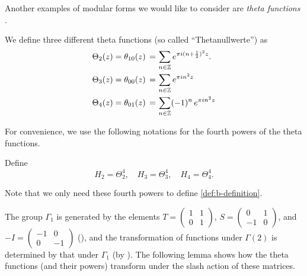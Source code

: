 Another examples of modular forms we would like to consider are \emph{theta functions} \cite[Section~3.1]{1-2-3}.
\begin{definition}\label{def:th00-th01-th10}\leanok
We define three different theta functions (so called ``Thetanullwerte'') as
\begin{align}
  \Theta_{2}(z) = \theta_{10}(z)\,=\, & \sum_{n\in\mathbb{Z}}e^{\pi i (n+\frac12)^2 z}.  \\
  \Theta_{3}(z) = \theta_{00}(z)\,=\, & \sum_{n\in\mathbb{Z}}e^{\pi i n^2 z}  \\
  \Theta_{4}(z) = \theta_{01}(z)\,=\, & \sum_{n\in\mathbb{Z}}(-1)^n\,e^{\pi i n^2 z}  \\
\end{align}
\end{definition}

For convenience, we use the following notations for the fourth powers of the theta functions.
\begin{definition}\label{def:H2-H3-H4}\leanok
Define
\begin{equation}
    H_2 = \Theta_2^4, \quad H_3 = \Theta_3^4, \quad H_4 = \Theta_4^4. \label{eqn:H2-H3-H4}
\end{equation}
\end{definition}
Note that we only need these fourth powers to define \eqref{def:b-definition}.

The group $\Gamma_1$ is generated by the elements $T=\left(\begin{smallmatrix}1&1\\0&1\end{smallmatrix}\right)$, $S=\left(\begin{smallmatrix}0&1\\-1&0\end{smallmatrix}\right)$, and $-I = \left(\begin{smallmatrix}-1&0\\0&-1\end{smallmatrix}\right)$ (), and the transformation of functions under $\Gamma(2)$ is determined by that under $\Gamma_1$ (by ).
The following lemma shows how the theta functions (and their powers) transform under the slash action of these matrices.

